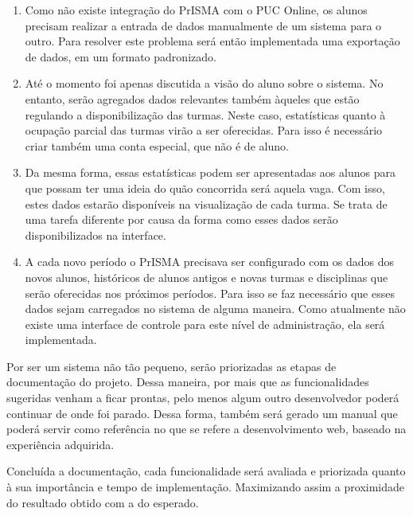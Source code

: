 \documentclass[graduacao,brazil]{ThesisPUC}
\begin{document}
\begin{enumerate}

  \item Como não existe integração do PrISMA com o PUC Online, os alunos precisam realizar a entrada de dados manualmente de um sistema para o outro. Para resolver este problema será então implementada uma exportação de dados, em um formato padronizado.

  \item Até o momento foi apenas discutida a visão do aluno sobre o sistema. No entanto, serão agregados dados relevantes também àqueles que estão regulando a disponibilização das turmas. Neste caso, estatísticas quanto à ocupação parcial das turmas virão a ser oferecidas. Para isso é necessário criar também uma conta especial, que não é de aluno.

  \item Da mesma forma, essas estatísticas podem ser apresentadas aos alunos para que possam ter uma ideia do quão concorrida será aquela vaga. Com isso, estes dados estarão disponíveis na visualização de cada turma. Se trata de uma tarefa diferente por causa da forma como esses dados serão disponibilizados na interface.

  \item A cada novo período o PrISMA precisava ser configurado com os dados dos novos alunos, históricos de alunos antigos e novas turmas e disciplinas que serão oferecidas nos próximos períodos. Para isso se faz necessário que esses dados sejam carregados no sistema de alguma maneira. Como atualmente não existe uma interface de controle para este nível de administração, ela será implementada.
\end{enumerate}

Por ser um sistema não tão pequeno, serão priorizadas as etapas de documentação do projeto. Dessa maneira, por mais que as funcionalidades sugeridas venham a ficar prontas, pelo menos algum outro desenvolvedor poderá continuar de onde foi parado. Dessa forma, também será gerado um manual que poderá servir como referência no que se refere a desenvolvimento web, baseado na experiência adquirida.

Concluída a documentação, cada funcionalidade será avaliada e priorizada quanto à sua importância e tempo de implementação. Maximizando assim a proximidade do resultado obtido com a do esperado.

\arial
\nocite{*}


\normalfont
\end{document}
